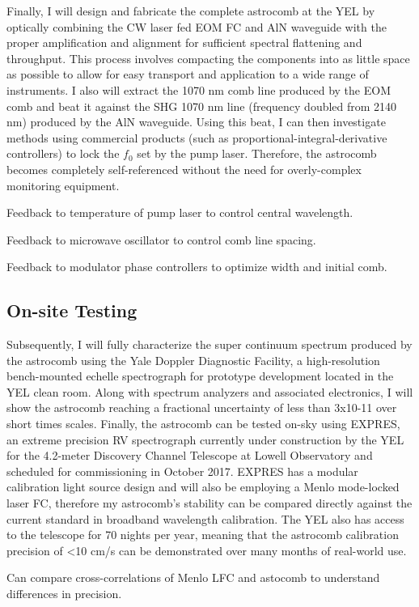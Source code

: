 \documentclass[11pt]{article}
\begin{document}
Finally, I will design and fabricate the complete astrocomb at the YEL by optically combining the CW laser fed EOM FC and AlN waveguide with the proper amplification and alignment for sufficient spectral flattening and throughput. This process involves compacting the components into as little space as possible to allow for easy transport and application to a wide range of instruments. I also will extract the 1070 nm comb line produced by the EOM comb and beat it against the SHG 1070 nm line (frequency doubled from 2140 nm) produced by the AlN waveguide. Using this beat, I can then investigate methods using commercial products (such as proportional-integral-derivative controllers) to lock the $f_0$ set by the pump laser. Therefore, the astrocomb becomes completely self-referenced without the need for overly-complex monitoring equipment.

Feedback to temperature of pump laser to control central wavelength.

Feedback to microwave oscillator to control comb line spacing.

Feedback to modulator phase controllers to optimize width and initial comb.

\subsection{On-site Testing}

Subsequently, I will fully characterize the super continuum spectrum produced by the astrocomb using the Yale Doppler Diagnostic Facility, a high-resolution bench-mounted echelle spectrograph for prototype development located in the YEL clean room. Along with spectrum analyzers and associated electronics, I will show the astrocomb reaching a fractional uncertainty of less than 3x10-11 over short times scales. Finally, the astrocomb can be tested on-sky using EXPRES, an extreme precision RV spectrograph currently under construction by the YEL for the 4.2-meter Discovery Channel Telescope at Lowell Observatory and scheduled for commissioning in October 2017. EXPRES has a modular calibration light source design and will also be employing a Menlo mode-locked laser FC, therefore my astrocomb’s stability can be compared directly against the current standard in broadband wavelength calibration. The YEL also has access to the telescope for 70 nights per year, meaning that the astrocomb calibration precision of <10 cm/s can be demonstrated over many months of real-world use.

Can compare cross-correlations of Menlo LFC and astocomb to understand differences in precision.
\end{document}
